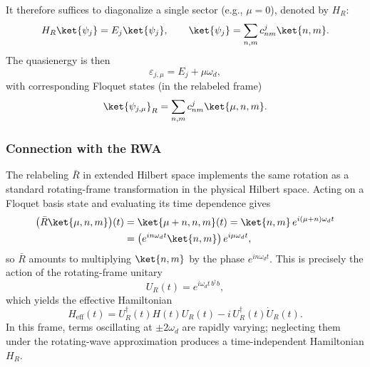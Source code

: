 It therefore suffices to diagonalize a single sector (e.g., $\mu=0$), denoted by $H_R$:
\begin{equation}
    H_R\ket{\psi_j}=E_j\ket{\psi_j},
    \qquad
    \ket{\psi_j}=\sum_{n,m}c_{nm}^j\ket{n,m}.
\end{equation}
The quasienergy  is then
\begin{equation}
    \varepsilon_{j,\mu}=E_j+\mu\omega_d,
\end{equation}
with corresponding Floquet states (in the relabeled frame)
\begin{equation}
    \ket{\psi_{j,\mu}}_{R}=\sum_{n,m}c_{nm}^j\ket{\mu,n,m}.
\end{equation}
\subsubsection{Connection with the RWA}
The relabeling $\bar R$ in extended Hilbert space implements the same rotation as a standard rotating-frame transformation in the physical Hilbert space. Acting on a Floquet basis state and evaluating its time dependence gives
\begin{align}
    \bigl(\bar R\ket{\mu,n,m}\bigr)(t)
    &= \ket{\mu+n,n,m}(t)
     = \ket{n,m}\,e^{i(\mu+n)\omega_d t} \nonumber\\
    &= \bigl(e^{in\omega_d t}\ket{n,m}\bigr)\,e^{i\mu\omega_d t},
\end{align}
so $\bar R$ amounts to multiplying $\ket{n,m}$ by the phase $e^{in\omega_d t}$. This is precisely the action of the rotating-frame unitary
\begin{equation}
    U_R(t)=e^{i\omega_d t\, b^\dagger b},
\end{equation}
which yields the effective Hamiltonian
\begin{equation}
    H_{\mathrm{eff}}(t)=U_R^\dagger(t)H(t)U_R(t)-i\,U_R^\dagger(t)\dot U_R(t).
\end{equation}
In this frame, terms oscillating at $\pm 2\omega_d$ are rapidly varying; neglecting them under the rotating-wave approximation produces a time-independent Hamiltonian $H_R$.
